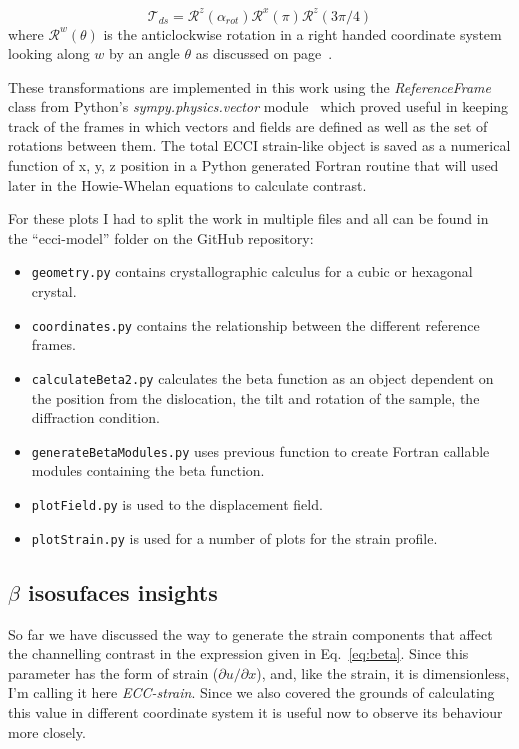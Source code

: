 \begin{equation}
    \mathcal{T}_{ds} = \mathcal{R}^z(\alpha_{rot}) \mathcal{R}^x(\pi) \mathcal{R}^z(3\pi/4)
\end{equation}
where $\mathcal{R}^w(\theta)$ is the anticlockwise rotation in a right handed coordinate system looking along $w$ by an angle $\theta$ as discussed on page~\pageref{subchap:basicRot}.

These transformations are implemented in this work using the \textit{ReferenceFrame} class from Python's
\textit{sympy.physics.vector} module~\cite{sympy} which proved useful in keeping track of the frames in which vectors and fields
are defined as well as the set of rotations between them. The total ECCI strain-like object is saved as a numerical
function of x, y, z position in a Python generated Fortran routine that will used later in the Howie-Whelan equations to calculate contrast. 

For these plots I had to split the work in multiple files and all can be found in the ``ecci-model'' folder on the GitHub repository: 
\begin{itemize}
    \item \texttt{geometry.py} contains crystallographic calculus for a cubic or hexagonal crystal.
    \item \texttt{coordinates.py} contains the relationship between the different reference frames.
    \item \texttt{calculateBeta2.py} calculates the beta function as an object dependent on the position from the dislocation, the tilt and rotation of the sample, the diffraction condition.
    \item \texttt{generateBetaModules.py} uses previous function to create Fortran callable modules containing the beta function.
    \item \texttt{plotField.py} is used to the displacement field.
    \item \texttt{plotStrain.py} is used for a number of plots for the strain profile.
\end{itemize}



\subsection{\texorpdfstring{$\beta$}{beta} isosufaces insights}
\label{sec:betacomparisons}
So far we have discussed the way to generate the strain components that affect the channelling contrast in the expression given in Eq.~\ref{eq:beta}. Since this parameter has the form of strain ($\partial u/ \partial x$), and, like the strain, it is dimensionless, I'm calling it here \textit{ECC-strain}. Since we also covered the grounds of calculating this value in different coordinate system it is useful now to observe its behaviour more closely.

